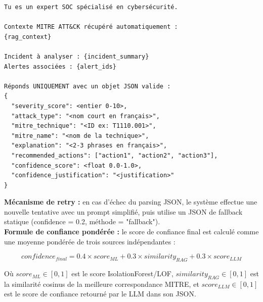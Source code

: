 \documentclass[12pt,a4paper]{report}
\begin{document}
\begin{tcolorbox}[colback=lightblue, colframe=darkblue, arc=5pt,
  title={\textbf{Template de prompt RAG — Explication d'incident}}]
\begin{small}
\begin{verbatim}
Tu es un expert SOC spécialisé en cybersécurité.

Contexte MITRE ATT&CK récupéré automatiquement :
{rag_context}

Incident à analyser : {incident_summary}
Alertes associées : {alert_ids}

Réponds UNIQUEMENT avec un objet JSON valide :
{
  "severity_score": <entier 0-10>,
  "attack_type": "<nom court en français>",
  "mitre_technique": "<ID ex: T1110.001>",
  "mitre_name": "<nom de la technique>",
  "explanation": "<2-3 phrases en français>",
  "recommended_actions": ["action1", "action2", "action3"],
  "confidence_score": <float 0.0-1.0>,
  "confidence_justification": "<justification>"
}
\end{verbatim}
\end{small}
\end{tcolorbox}

\begin{onehalfspace}
\textbf{Mécanisme de retry :} en cas d'échec du parsing JSON, le système
effectue une nouvelle tentative avec un prompt simplifié, puis utilise un
JSON de fallback statique (confidence = 0.2, méthode = "fallback").\\[6pt]

\textbf{Formule de confiance pondérée :} le score de confiance final est
calculé comme une moyenne pondérée de trois sources indépendantes :
\end{onehalfspace}

\begin{tcolorbox}[colback=lightblue, colframe=darkblue, arc=5pt,
  title={\textbf{Formule de confiance pondérée}}]
\[
confidence_{final} = 0.4 \times score_{ML} + 0.3 \times similarity_{RAG}
+ 0.3 \times score_{LLM}
\]
\end{tcolorbox}

\begin{onehalfspace}
Où $score_{ML} \in [0,1]$ est le score IsolationForest/LOF, $similarity_{RAG}
\in [0,1]$ est la similarité cosinus de la meilleure correspondance MITRE,
et $score_{LLM} \in [0,1]$ est le score de confiance retourné par le LLM
dans son JSON.
\end{onehalfspace}
\end{document}
